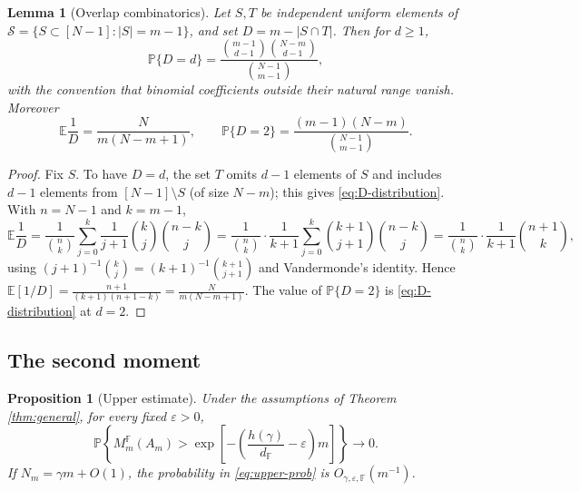 \documentclass[preprint,12pt]{elsarticle}
\newtheorem{proposition}[theorem]{Proposition}
\newtheorem{lemma}[theorem]{Lemma}
\newcommand{\F}{\mathbb{F}}
\newcommand{\PP}{\mathbb{P}}
\newcommand{\EE}{\mathbb{E}}
\newcommand{\cS}{\mathcal{S}}
\begin{document}
\begin{lemma}[Overlap combinatorics]\label{lem:overlap}
Let $S,T$ be independent uniform elements of $\cS=\{S\subset[N-1]: |S|=m-1\}$, and set $D=m-|S\cap T|$.
Then for $d\ge1$,
\begin{equation}\label{eq:D-distribution}
  \PP\{D=d\}=\frac{\binom{m-1}{d-1}\binom{N-m}{d-1}}{\binom{N-1}{m-1}},
\end{equation}
with the convention that binomial coefficients outside their natural range vanish. Moreover
\begin{equation}\label{eq:EDinv}
  \EE\frac1D=\frac{N}{m(N-m+1)},
  \qquad
  \PP\{D=2\}=\frac{(m-1)(N-m)}{\binom{N-1}{m-1}}.
\end{equation}
\end{lemma}

\begin{proof}
Fix $S$. To have $D=d$, the set $T$ omits $d-1$ elements of $S$ and includes $d-1$ elements from
$[N-1]\setminus S$ (of size $N-m$); this gives \eqref{eq:D-distribution}. With $n=N-1$ and $k=m-1$,
\[
  \EE\frac1D=\frac1{\binom nk}\sum_{j=0}^k\frac1{j+1}\binom kj\binom{n-k}{j}
  =\frac1{\binom nk}\cdot\frac1{k+1}\sum_{j=0}^k\binom{k+1}{j+1}\binom{n-k}{j}
  =\frac{1}{\binom nk}\cdot\frac{1}{k+1}\binom{n+1}{k},
\]
using $(j+1)^{-1}\binom kj=(k+1)^{-1}\binom{k+1}{j+1}$ and Vandermonde's identity. Hence
$\EE[1/D]=\frac{n+1}{(k+1)(n+1-k)}=\frac{N}{m(N-m+1)}$. The value of $\PP\{D=2\}$ is
\eqref{eq:D-distribution} at $d=2$.
\end{proof}

\subsection{The second moment}

\begin{proposition}[Upper estimate]\label{prop:upper}
Under the assumptions of Theorem \ref{thm:general}, for every fixed $\varepsilon>0$,
\begin{equation}\label{eq:upper-prob}
  \PP\left\{M_m^\F(A_m)>\exp\left[-\left(\frac{h(\gamma)}{d_\F}-\varepsilon\right)m\right]\right\}\to0.
\end{equation}
If $N_m=\gamma m+O(1)$, the probability in \eqref{eq:upper-prob} is $O_{\gamma,\varepsilon,\F}(m^{-1})$.
\end{proposition}
\end{document}
